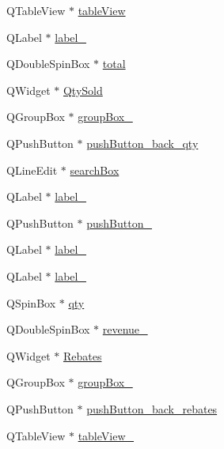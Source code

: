 \begin{DoxyCompactItemize}
Q\+Table\+View $\ast$ \hyperlink{class_ui___main_window_a3f4332a5b5e82f676f25ec3148c1c83c}{table\+View}
\item 
Q\+Label $\ast$ \hyperlink{class_ui___main_window_a0e90c7e9ad77386881e0b264ddb9dd22}{label\+\_}
\item 
Q\+Double\+Spin\+Box $\ast$ \hyperlink{class_ui___main_window_a6a1b55d56f36b8feda665923834ba42c}{total}
\item 
Q\+Widget $\ast$ \hyperlink{class_ui___main_window_a72bc520a1087e123788b84ffdbafba27}{Qty\+Sold}
\item 
Q\+Group\+Box $\ast$ \hyperlink{class_ui___main_window_ab492988d340548c7f30e098419ef10ee}{group\+Box\+\_}
\item 
Q\+Push\+Button $\ast$ \hyperlink{class_ui___main_window_a523ac53f65c2145cbf520b0b4a9a9407}{push\+Button\+\_\+back\+\_\+qty}
\item 
Q\+Line\+Edit $\ast$ \hyperlink{class_ui___main_window_a70fa1b67c536ae26805102f4634ada43}{search\+Box}
\item 
Q\+Label $\ast$ \hyperlink{class_ui___main_window_a4a18586583a48765b392cbab0ea7545c}{label\+\_}
\item 
Q\+Push\+Button $\ast$ \hyperlink{class_ui___main_window_aa963d4a426fb7c8b9fb40961d1e5129d}{push\+Button\+\_}
\item 
Q\+Label $\ast$ \hyperlink{class_ui___main_window_a7a9350c6de61e7051850744487d910bd}{label\+\_}
\item 
Q\+Label $\ast$ \hyperlink{class_ui___main_window_a29b781f23566d0f91b217459c06929ba}{label\+\_}
\item 
Q\+Spin\+Box $\ast$ \hyperlink{class_ui___main_window_a2aab2aa811c3c664391bd64475687a4e}{qty}
\item 
Q\+Double\+Spin\+Box $\ast$ \hyperlink{class_ui___main_window_afe5d5ef301e2668b45c94e2c52671077}{revenue\+\_}
\item 
Q\+Widget $\ast$ \hyperlink{class_ui___main_window_a9a80d578ad5b3a60a250a581a4cfdc45}{Rebates}
\item 
Q\+Group\+Box $\ast$ \hyperlink{class_ui___main_window_a99094c0c4a9e6e16b75d44d2b60c3b08}{group\+Box\+\_}
\item 
Q\+Push\+Button $\ast$ \hyperlink{class_ui___main_window_a0a6592db44fe4e61ee19c9be2f22dc48}{push\+Button\+\_\+back\+\_\+rebates}
\item 
Q\+Table\+View $\ast$ \hyperlink{class_ui___main_window_abdb042ed649d7bde8891d00c3b36286d}{table\+View\+\_}
\item 

\end{DoxyCompactItemize}

